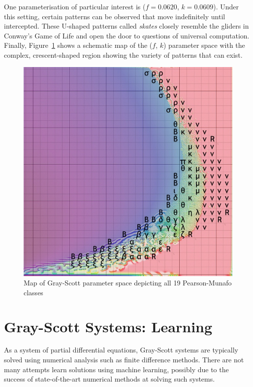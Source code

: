 One parameterisation of particular interest is ($f=0.0620$, $k=0.0609$). Under this setting, certain patterns can be observed that move indefinitely until intercepted. These U-shaped patterns called \textit{skates} closely resemble the gliders in Conway's Game of Life and open the door to questions of universal computation. Finally, Figure~\ref{fig:xmorphia} shows a schematic map of the ($f$, $k$) parameter space with the complex, crescent-shaped region showing the variety of patterns that can exist.\\

\begin{figure}[!h]
\centering
\includegraphics[width=.9\textwidth]{images/munafo/xmorphia.jpg}
\caption{Map of Gray-Scott parameter space depicting all 19 Pearson-Munafo classes \cite{xmorphia}}
\label{fig:xmorphia}
\end{figure}

\section{Gray-Scott Systems: Learning}

As a system of partial differential equations, Gray-Scott systems are typically solved using numerical analysis such as finite difference methods\cite{manaa2013successive}. There are not many attempts learn solutions using machine learning, possibly due to the success of state-of-the-art numerical methods at solving such systems.\\

